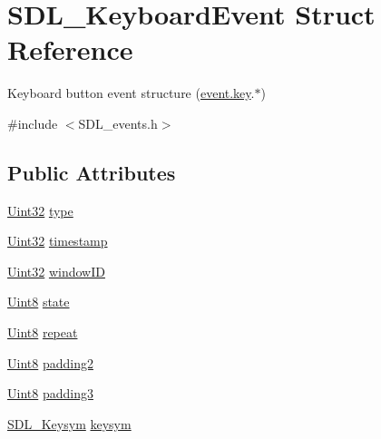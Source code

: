 \hypertarget{struct_s_d_l___keyboard_event}{\section{S\-D\-L\-\_\-\-Keyboard\-Event Struct Reference}
\label{struct_s_d_l___keyboard_event}
}


Keyboard button event structure (\hyperlink{union_s_d_l___event_ab99927835cc77a9b6bb50b419b4a27df}{event.\-key}.$\ast$)  




{\ttfamily \#include $<$S\-D\-L\-\_\-events.\-h$>$}

\subsection*{Public Attributes}
\begin{DoxyCompactItemize}
\item 
\hyperlink{_s_d_l__stdinc_8h_add440eff171ea5f55cb00c4a9ab8672d}{Uint32} \hyperlink{struct_s_d_l___keyboard_event_ae0b2f2aace6f80c1f47e5a14350d409a}{type}
\item 
\hyperlink{_s_d_l__stdinc_8h_add440eff171ea5f55cb00c4a9ab8672d}{Uint32} \hyperlink{struct_s_d_l___keyboard_event_a3da1d8f6892e7f6ee28d9eafdb5e7d02}{timestamp}
\item 
\hyperlink{_s_d_l__stdinc_8h_add440eff171ea5f55cb00c4a9ab8672d}{Uint32} \hyperlink{struct_s_d_l___keyboard_event_a56efb6780b96acd5b50d8f797efb3546}{window\-I\-D}
\item 
\hyperlink{_s_d_l__stdinc_8h_a2944638813a090aa23e62f4da842c3e2}{Uint8} \hyperlink{struct_s_d_l___keyboard_event_a110558eb96c113c86cfa31a7018c2346}{state}
\item 
\hyperlink{_s_d_l__stdinc_8h_a2944638813a090aa23e62f4da842c3e2}{Uint8} \hyperlink{struct_s_d_l___keyboard_event_a3edac3b36304812d533795c9df4ed4c1}{repeat}
\item 
\hyperlink{_s_d_l__stdinc_8h_a2944638813a090aa23e62f4da842c3e2}{Uint8} \hyperlink{struct_s_d_l___keyboard_event_ae270122f757f76171318294afd2c95e6}{padding2}
\item 
\hyperlink{_s_d_l__stdinc_8h_a2944638813a090aa23e62f4da842c3e2}{Uint8} \hyperlink{struct_s_d_l___keyboard_event_ae1831035ef556a7b09efcd2469f26f7a}{padding3}
\item 
\hyperlink{struct_s_d_l___keysym}{S\-D\-L\-\_\-\-Keysym} \hyperlink{struct_s_d_l___keyboard_event_a2a57ba820a298f2c02ad5d41fd2b1aa8}{keysym}
\end{DoxyCompactItemize}


